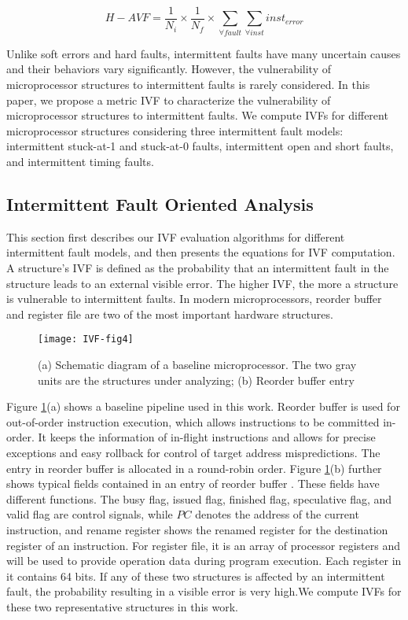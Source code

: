 \begin{equation} \label{eq:havf}
    H-AVF=\frac{1}{N_{i}} \times \frac{1}{N_{f}} \times \sum_{\forall fault}^{}\sum_{\forall inst}^{}inst_{error}
\end{equation}

Unlike soft errors and hard faults, intermittent faults have many uncertain causes and their behaviors vary significantly. However, the vulnerability of microprocessor structures to intermittent faults is rarely considered. In this paper, we propose a metric IVF to characterize the vulnerability of microprocessor structures to intermittent faults. We compute IVFs for different microprocessor structures considering three intermittent fault models: intermittent stuck-at-1 and stuck-at-0 faults, intermittent open and short faults, and intermittent timing faults.

\subsection{Intermittent Fault Oriented Analysis}
This section first describes our IVF evaluation algorithms for different intermittent fault models, and then presents the equations for IVF computation. A structure’s IVF is defined as the probability that an intermittent fault in the structure leads to an external visible error. The higher IVF, the more a structure is vulnerable to intermittent faults. In modern microprocessors, reorder buffer and register file are two of the most important hardware structures.

\begin{figure}[t]
    \centering
    \texttt{[image: IVF-fig4]}\\
    \caption{(a) Schematic diagram of a baseline microprocessor. The two gray units are the structures under analyzing; (b) Reorder buffer entry \cite{shen2013modern}}
    \label{fig:baseline-processor}
\end{figure}


Figure \ref{fig:baseline-processor}(a) shows a baseline pipeline used in this work. Reorder buffer is used for out-of-order instruction execution, which allows instructions to be committed in-order. It keeps the information of in-flight instructions and allows for precise exceptions and easy rollback for control of target address mispredictions. The entry in reorder buffer is allocated in a round-robin order. Figure \ref{fig:baseline-processor}(b) further shows typical fields contained in an entry of reorder buffer \cite{shen2013modern}. These fields have different functions. The busy flag, issued flag, finished flag, speculative flag, and valid flag are control signals, while $PC$ denotes the address of the current instruction, and rename register shows the renamed register for the destination register of an instruction. For register file, it is an array of processor registers and will be used to provide operation data during program execution. Each register in it contains 64 bits. If any of these two structures is affected by an intermittent fault, the probability resulting in a visible error is very high.We compute IVFs for these two representative structures in this work.

